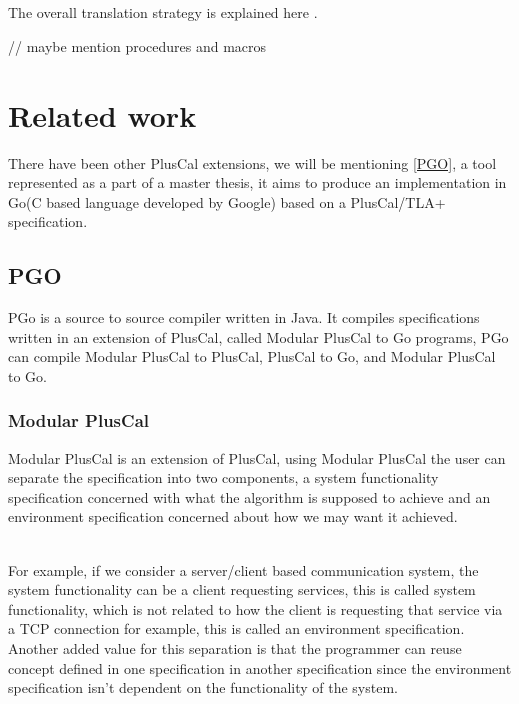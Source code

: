 \documentclass{thesul}
\begin{document}
\hfill\\


\hfill\\
The overall translation strategy is explained here \cite{pcalAlgo}.

// maybe mention procedures and macros
 

\chapter{Related work}

There have been other PlusCal extensions, we will be mentioning \ref{PGO}, a tool represented as a part of a master thesis, it aims to produce an implementation in Go(C based language developed by Google) based on a PlusCal/TLA+ specification.

\section{PGO}

PGo is a source to source compiler written in Java. It compiles specifications written in an extension of PlusCal, called Modular PlusCal to Go programs, PGo can compile Modular PlusCal to PlusCal, PlusCal to Go, and Modular PlusCal to Go.

\subsection{Modular PlusCal}

Modular PlusCal is an extension of PlusCal, using Modular PlusCal the user can separate the specification into two components, a system functionality specification concerned with what the algorithm is supposed to achieve and an environment specification concerned about how we may want it achieved.

\hfill\\

For example, if we consider a server/client based communication system, the system functionality can be a client requesting services, this is called system functionality, which is not related to how the client is requesting that service via a TCP connection for example, this is called an environment specification. Another added value for this separation is that the programmer can reuse concept defined in one specification in another specification since the environment specification isn't dependent on the functionality of the system.
\end{document}
